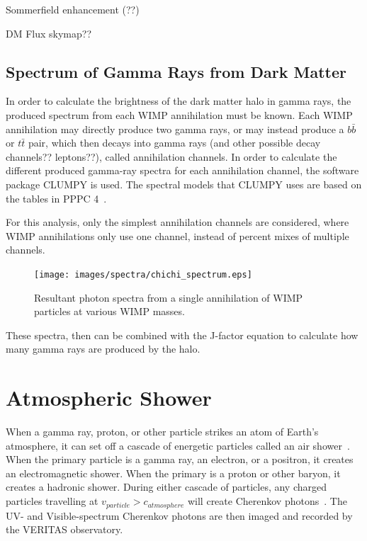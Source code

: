     {\color{red}Sommerfield enhancement (??)}

    
    {\color{red}DM Flux skymap??}
    
  \subsection{Spectrum of Gamma Rays from Dark Matter}\label{dm_spectral}
    In order to calculate the brightness of the dark matter halo in gamma rays, the produced spectrum from each WIMP annihilation must be known.
    Each WIMP annihilation may directly produce two gamma rays, or may instead produce a $b\bar{b}$  or $t\bar{t}$ pair, which then decays into gamma rays {\color{red}(and other possible decay channels?? leptons??)}, called annihilation channels.
    In order to calculate the different produced gamma-ray spectra for each annihilation channel, the software package CLUMPY \cite{CLUMPYcode} is used.
    The spectral models that CLUMPY uses are based on the tables in PPPC 4~\cite{pppc4_dm_spectra}.

    For this analysis, only the simplest annihilation channels are considered, where WIMP annihilations only use one channel, instead of percent mixes of multiple channels.

    \begin{figure}[ht]
      \centering
      \texttt{[image: images/spectra/chichi\_spectrum.eps]}
      \caption[Single Annihilation Spectra]{
        Resultant photon spectra from a single annihilation of WIMP particles at various WIMP masses.}
      \label{fig:chichi_spectrum}
    \end{figure}

    These spectra, then can be combined with the J-factor equation to calculate how many gamma rays are produced by the halo.

    \FloatBarrier
    
    
\section{Atmospheric Shower}

  When a gamma ray, proton, or other particle strikes an atom of Earth's atmosphere, it can set off a cascade of energetic particles called an air shower~\cite{Bethe1934,Klein1999}.
  When the primary particle is a gamma ray, an electron, or a positron, it creates an electromagnetic shower.
  When the primary is a proton or other baryon, it creates a hadronic shower.
  During either cascade of particles, any charged particles travelling at $v_{particle} > c_{atmosphere}$ will create Cherenkov photons~\cite{cherenkov}.
  The UV- and Visible-spectrum Cherenkov photons are then imaged and recorded by the VERITAS observatory.


